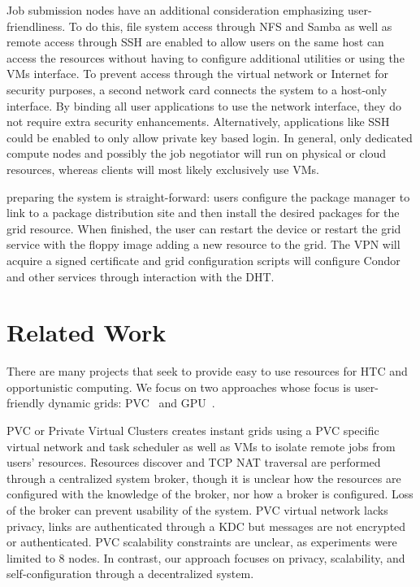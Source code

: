 \documentclass{sig-alternate}
\begin{document}
Job submission nodes have an additional consideration emphasizing
user-friendliness.  To do this, file system access through NFS and Samba
as well as remote access through SSH are enabled to allow users on the same
host can access the resources without having to configure additional utilities
or using the VMs interface.  To prevent access through the virtual network or
Internet for security purposes, a second network card connects the system to
a host-only interface.  By binding all user applications to use the network
interface, they do not require extra security enhancements.  Alternatively,
applications like SSH could be enabled to only allow private key based login.
In general, only dedicated compute nodes and possibly the job negotiator will
run on physical or cloud resources, whereas clients will most likely
exclusively use VMs.

preparing the system is straight-forward: users configure the package manager to
link to a package distribution site and then install the desired packages for
the grid resource.  When finished, the user can restart the device or restart
the grid service with the floppy image adding a new resource to the grid.  The
VPN will acquire a signed certificate and grid configuration scripts will
configure Condor and other services through interaction with the DHT.

\section{Related Work}
\label{related_work}
There are many projects that seek to provide easy to use resources for HTC
and opportunistic computing.  We focus on two approaches whose focus is
user-friendly dynamic grids: PVC~\cite{pvc} and GPU~\cite{gpu}.

PVC or Private Virtual Clusters creates instant grids using a PVC specific
virtual network and task scheduler as well as VMs to isolate remote jobs from
users' resources.  Resources discover and TCP NAT traversal are performed
through a centralized system broker, though it is unclear how the resources are
configured with the knowledge of the broker, nor how a broker is configured.
Loss of the broker can prevent usability of the system.  PVC virtual network
lacks privacy, links are authenticated through a KDC but messages are not
encrypted or authenticated.  PVC scalability constraints are unclear, as
experiments were limited to 8 nodes.  In contrast, our approach focuses on
privacy, scalability, and self-configuration through a decentralized system.
\end{document}
